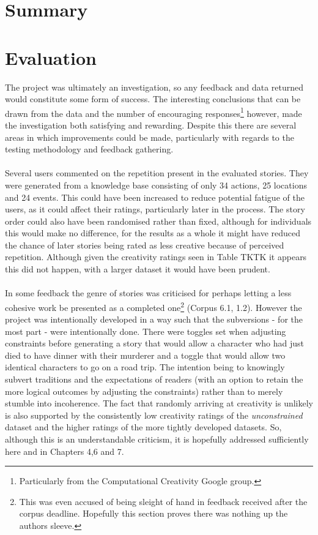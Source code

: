 \documentclass[letterpaper]{article}
\begin{document}
\section{Summary}

\section{Evaluation}
The project was ultimately an investigation, so any feedback and data returned would constitute some form of success. The interesting conclusions that can be drawn from the data and the number of encouraging responses\footnote{Particularly from the Computational Creativity Google group.} however, made the investigation both satisfying and rewarding. Despite this there are several areas in which improvements could be made, particularly with regards to the testing methodology and feedback gathering.\\
\\Several users commented on the repetition present in the evaluated stories. They were generated from a knowledge base consisting of only 34 actions, 25 locations and 24 events. This could have been increased to reduce potential fatigue of the users, as it could affect their ratings, particularly later in the process. The story order could also have been randomised rather than fixed, although for individuals this would make no difference, for the results as a whole it might have reduced the chance of later stories being rated as less creative because of perceived repetition. Although given the creativity ratings seen in Table TKTK it appears this did not happen, with a larger dataset it would have been prudent.\\
\\In some feedback the genre of stories was criticised for perhaps letting a less cohesive work be presented as a completed one\footnote{This was even accused of being sleight of hand in feedback received after the corpus deadline. Hopefully this section proves there was nothing up the authors sleeve.} (Corpus 6.1, 1.2). However the project was intentionally developed in a way such that the subversions - for the most part - were intentionally done. There were toggles set when adjusting constraints before generating a story that would allow a character who had just died to have dinner with their murderer and a toggle that would allow two identical characters to go on a road trip. The intention being to knowingly subvert traditions and the expectations of readers (with an option to retain the more logical outcomes by adjusting the constraints) rather than to merely stumble into incoherence. The fact that randomly arriving at creativity is unlikely is also supported by the consistently low creativity ratings of the \emph{unconstrained} dataset and the higher ratings of the more tightly developed datasets. So, although this is an understandable criticism, it is hopefully addressed sufficiently here and in Chapters 4,6 and 7.\\
\end{document}
